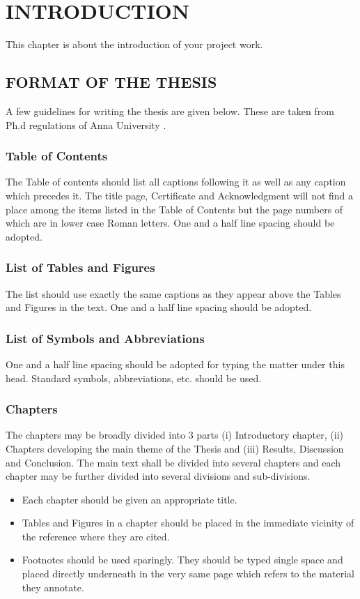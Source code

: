 
\chapter{\uppercase{Introduction}} %
\label{intro} %
This chapter is about the introduction of your project work. 
\section{\uppercase{Format of the thesis}}
A few guidelines for writing the thesis are given below. These are taken from Ph.d regulations of Anna University \cite{regulations}.
\subsection{Table of Contents}
The Table of contents should list all captions following it as well as any caption which precedes it. The title page, Certificate and Acknowledgment will not find a place among the items listed in the Table of Contents but the page numbers of which are in lower case Roman letters. One and a half line spacing should be adopted.
\subsection{List of Tables and Figures}
The list should use exactly the same captions as they appear above the Tables and Figures in the text. One and a half line spacing should be adopted.
\newpage
\subsection{List of Symbols and Abbreviations}
One and a half line spacing should be adopted for typing the matter under this head. Standard symbols, abbreviations, etc.
should be used.
\subsection{Chapters}
The chapters may be broadly divided into 3 parts (i) Introductory chapter, (ii) Chapters developing the main theme of the Thesis and (iii) Results, Discussion and Conclusion. The main text shall be divided into several chapters and each chapter may be further divided into several divisions and sub-divisions.
\begin{itemize}
 \item Each chapter should be given an appropriate title.
 \item Tables and Figures in a chapter should be placed in the immediate vicinity of the reference where they are cited.
 \item Footnotes should be used sparingly. They should be typed single space and
placed directly underneath in the very same page which refers to the material
they annotate.
\end{itemize}
